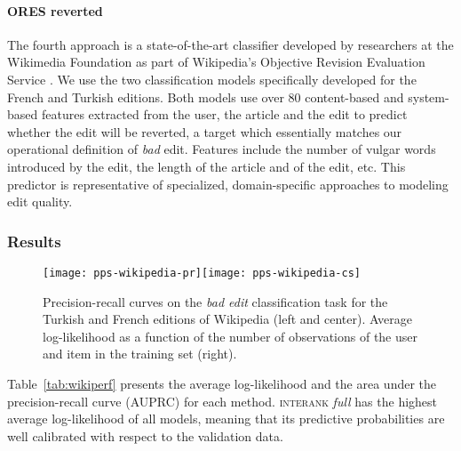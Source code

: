 \paragraph{ORES reverted}
The fourth approach is a state-of-the-art classifier developed by researchers at the Wikimedia Foundation as part of Wikipedia's Objective Revision Evaluation Service \citep{wikimedia2015artificial}.
We use the two classification models specifically developed for the French and Turkish editions.
Both models use over \num{80} content-based and system-based features extracted from the user, the article and the edit to predict whether the edit will be reverted, a target which essentially matches our operational definition of \emph{bad} edit.
Features include the number of vulgar words introduced by the edit, the length of the article and of the edit, etc.
This predictor is representative of specialized, domain-specific approaches to modeling edit quality.

\subsubsection{Results}

\begin{figure*}
	\texttt{[image: pps-wikipedia-pr]}\hfill\texttt{[image: pps-wikipedia-cs]}
	\caption{Precision-recall curves on the \emph{bad edit} classification task for the Turkish and French editions of Wikipedia (left and center).
		Average log-likelihood as a function of the number of observations of the user and item in the training set (right).}
	\label{fig:wikipr}
\end{figure*}

Table~\ref{tab:wikiperf} presents the average log-likelihood and the area under the precision-recall curve (AUPRC) for each method.
\textsc{interank} \emph{full} has the highest average log-likelihood of all models, meaning that its predictive probabilities are well calibrated with respect to the validation data.

